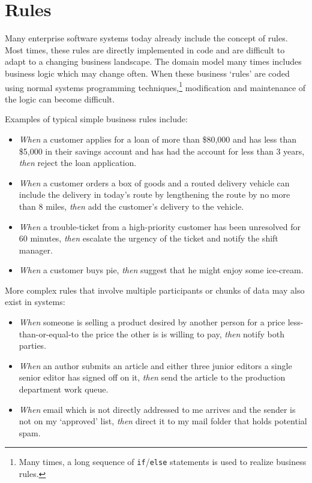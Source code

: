 \section{Rules}

Many enterprise software systems today already include the concept of
rules.  Most times, these rules are directly implemented in code and
are difficult to adapt to a changing business landscape.  The domain
model many times includes business logic which may change often. When
these business `rules' are coded using normal systems programming
techniques,\footnote{Many times, a long sequence of
\texttt{if}/\texttt{else} statements is used to realize business
rules.} modification and maintenance of the logic can become
difficult.

Examples of typical simple business rules include:

\begin{itemize}

	\item \emph{When} a customer applies for a loan of more than \$80,000 
		and has less than \$5,000 in their savings account and
		has had the account for less than 3 years, \emph{then} reject
		the loan application.

	\item \emph{When} a customer orders a box of goods and a routed delivery 
		vehicle can include the delivery in today's route by
		lengthening the route by no more than 8 miles, \emph{then} add
		the customer's delivery to the vehicle.

	\item \emph{When} a trouble-ticket from a high-priority customer has
		been unresolved for 60 minutes, \emph{then} escalate the urgency of the
		ticket and notify the shift manager.

	\item \emph{When} a customer buys pie, \emph{then} suggest that he
		might enjoy some ice-cream.
		
\end{itemize}

More complex rules that involve multiple participants or chunks of data
may also exist in systems:

\begin{itemize}

	\item \emph{When} someone is selling a product desired by another person
		for a price less-than-or-equal-to the price the other is
		is willing to pay, \emph{then} notify both parties.

	\item \emph{When} an author submits an article and either three junior
		editors a single senior editor has signed off on it, \emph{then} send
		the article to the production department work queue.

	\item \emph{When} email which is not directly addressed to me arrives and the
		sender is not on my `approved' list, \emph{then} direct it to
		my mail folder that holds potential spam.

\end{itemize}

